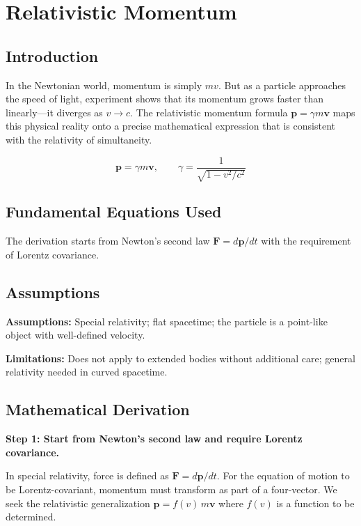 \chapter{Relativistic Momentum}

\section*{Introduction}

In the Newtonian world, momentum is simply $mv$. But as a particle approaches the speed of light, experiment shows that its momentum grows faster than linearly---it diverges as $v \to c$. The relativistic momentum formula $\mathbf{p} = \gamma m\mathbf{v}$ maps this physical reality onto a precise mathematical expression that is consistent with the relativity of simultaneity.


\begin{equation}
\mathbf{p} = \gamma m \mathbf{v}, \qquad \gamma = \frac{1}{\sqrt{1 - v^2/c^2}}
\end{equation}

\section*{Fundamental Equations Used}

The derivation starts from Newton's second law $\mathbf{F} = d\mathbf{p}/dt$ with the requirement of Lorentz covariance.

\section*{Assumptions}

\textbf{Assumptions:} Special relativity; flat spacetime; the particle is a point-like object with well-defined velocity.


\textbf{Limitations:} Does not apply to extended bodies without additional care; general relativity needed in curved spacetime.


\section*{Mathematical Derivation}

\textbf{Step 1: Start from Newton's second law and require Lorentz covariance.}

In special relativity, force is defined as $\mathbf{F} = d\mathbf{p}/dt$. For the equation of motion to be Lorentz-covariant, momentum must transform as part of a four-vector. We seek the relativistic generalization $\mathbf{p} = f(v)\,m\mathbf{v}$ where $f(v)$ is a function to be determined.

